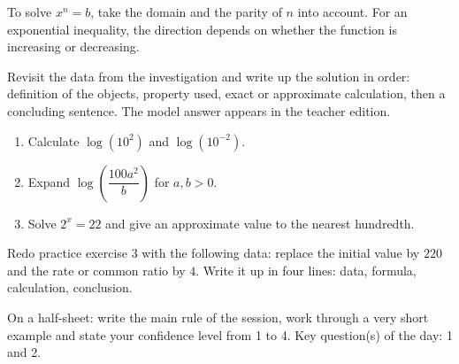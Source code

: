 \begin{traceecrite}To solve $x^n=b$, take the domain and the parity of $n$ into account. For an exponential inequality, the direction depends on whether the function is increasing or decreasing.\end{traceecrite}

\begin{exemple}
Revisit the data from the investigation and write up the solution in order: definition of the objects, property used, exact or approximate calculation, then a concluding sentence. The model answer appears in the teacher edition.
\end{exemple}

\begin{exercice}[-- essentiel]
\begin{enumerate}\item Calculate $\log(10^2)$ and $\log(10^{-2})$.\item Expand $\log\!\left(\dfrac{100a^2}{b}\right)$ for $a,b>0$.\item Solve $2^x=22$ and give an approximate value to the nearest hundredth.\end{enumerate}
\end{exercice}


\begin{dm}Redo practice exercise 3 with the following data: replace the initial value by $220$ and the rate or common ratio by $4$. Write it up in four lines: data, formula, calculation, conclusion.\end{dm}

\begin{sortie}On a half-sheet: write the main rule of the session, work through a very short example and state your confidence level from 1 to 4. Key question(s) of the day: 1 and 2.\end{sortie}

